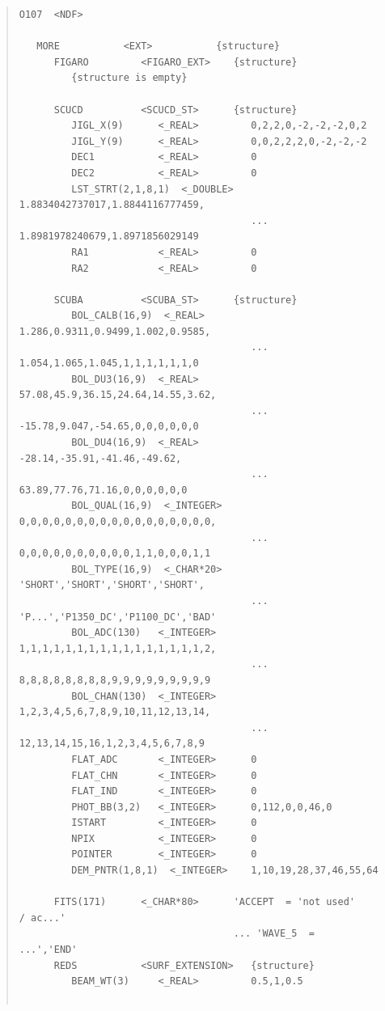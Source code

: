 \documentclass[twoside,11pt]{article}
\newenvironment{myquote}{\begin{quote}\begin{small}}{\end{small}\end{quote}}
\renewcommand{\_}{\texttt{\symbol{95}}}
\begin{document}
\begin{myquote}
\begin{verbatim}
O107  <NDF>

   MORE           <EXT>           {structure}
      FIGARO         <FIGARO_EXT>    {structure}
         {structure is empty}

      SCUCD          <SCUCD_ST>      {structure}
         JIGL_X(9)      <_REAL>         0,2,2,0,-2,-2,-2,0,2
         JIGL_Y(9)      <_REAL>         0,0,2,2,2,0,-2,-2,-2
         DEC1           <_REAL>         0
         DEC2           <_REAL>         0
         LST_STRT(2,1,8,1)  <_DOUBLE>   1.8834042737017,1.8844116777459,
                                        ... 1.8981978240679,1.8971856029149
         RA1            <_REAL>         0
         RA2            <_REAL>         0

      SCUBA          <SCUBA_ST>      {structure}
         BOL_CALB(16,9)  <_REAL>        1.286,0.9311,0.9499,1.002,0.9585,
                                        ... 1.054,1.065,1.045,1,1,1,1,1,1,0
         BOL_DU3(16,9)  <_REAL>         57.08,45.9,36.15,24.64,14.55,3.62,
                                        ... -15.78,9.047,-54.65,0,0,0,0,0,0
         BOL_DU4(16,9)  <_REAL>         -28.14,-35.91,-41.46,-49.62,
                                        ... 63.89,77.76,71.16,0,0,0,0,0,0
         BOL_QUAL(16,9)  <_INTEGER>     0,0,0,0,0,0,0,0,0,0,0,0,0,0,0,0,0,
                                        ... 0,0,0,0,0,0,0,0,0,0,1,1,0,0,0,1,1
         BOL_TYPE(16,9)  <_CHAR*20>     'SHORT','SHORT','SHORT','SHORT',
                                        ... 'P...','P1350_DC','P1100_DC','BAD'
         BOL_ADC(130)   <_INTEGER>      1,1,1,1,1,1,1,1,1,1,1,1,1,1,1,1,2,
                                        ... 8,8,8,8,8,8,8,8,9,9,9,9,9,9,9,9,9
         BOL_CHAN(130)  <_INTEGER>      1,2,3,4,5,6,7,8,9,10,11,12,13,14,
                                        ... 12,13,14,15,16,1,2,3,4,5,6,7,8,9
         FLAT_ADC       <_INTEGER>      0
         FLAT_CHN       <_INTEGER>      0
         FLAT_IND       <_INTEGER>      0
         PHOT_BB(3,2)   <_INTEGER>      0,112,0,0,46,0
         ISTART         <_INTEGER>      0
         NPIX           <_INTEGER>      0
         POINTER        <_INTEGER>      0
         DEM_PNTR(1,8,1)  <_INTEGER>    1,10,19,28,37,46,55,64

      FITS(171)      <_CHAR*80>      'ACCEPT  = 'not used'           / ac...'
                                     ... 'WAVE_5  =                 ...','END'
      REDS           <SURF_EXTENSION>   {structure}
         BEAM_WT(3)     <_REAL>         0.5,1,0.5


\end{verbatim}
\end{myquote}
\end{document}
